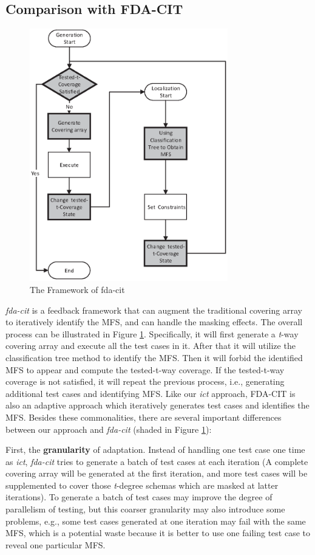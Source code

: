 \documentclass[10pt,journal,compsoc]{IEEEtran}
\begin{document}
\subsection{Comparison with FDA-CIT}\label{sec:emprical:CompareFDA}
\begin{figure}[ht]
 \includegraphics[width=3.4in]{fd-cit.eps}
\caption{The Framework of fda-cit}
\label{fda-cit-life}
\end{figure}
\emph{fda-cit} \cite{yilmaz2013reducing} is a feedback framework that can augment the traditional covering array to iteratively identify the MFS, and can handle the masking effects. The overall process can be illustrated in Figure \ref{fda-cit-life}. Specifically, it will first generate a \emph{t}-way covering array and execute all the test cases in it. After that it will utilize the classification tree method to identify the MFS. Then it will forbid the identified MFS to appear and compute the tested-t-way coverage. If the tested-t-way coverage is not satisfied, it will repeat the previous process, i.e., generating additional test cases and identifying MFS. Like our \emph{ict} approach, FDA-CIT is also an adaptive approach which iteratively generates test cases and identifies the MFS. Besides these commonalities, there are several important differences between our approach and \emph{fda-cit} (shaded in Figure \ref{fda-cit-life}):

First, the \textbf{granularity} of adaptation. Instead of handling one test case one time as \emph{ict}, \emph{fda-cit} tries to generate a batch of test cases at each iteration (A complete covering array will be generated at the first iteration, and more test cases will be supplemented to cover those \emph{t}-degree schemas which are masked at latter iterations). To generate a batch of test cases may improve the degree of parallelism of testing, but this coarser granularity may also introduce some problems, e.g., some test cases generated at one iteration may fail with the same MFS, which is a potential waste because it is better to use one failing test case to reveal one particular MFS.
\end{document}
